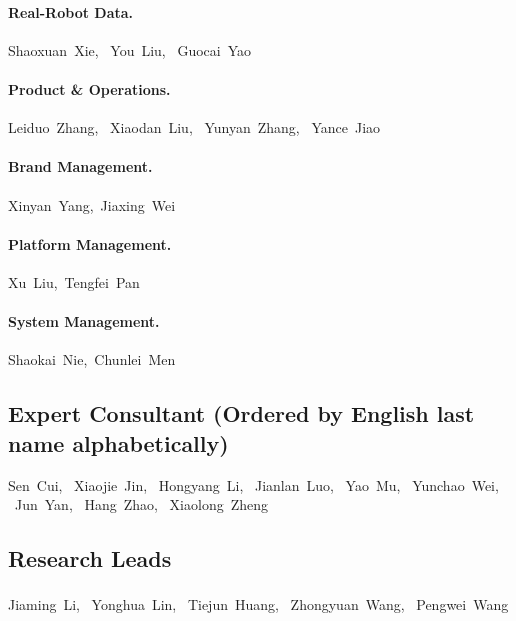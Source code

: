 \documentclass{llmxive}
\makeatletter
\providecommand{\thefootnote}{}
\providecommand{\@makefntext}[1]{\noindent #1}
\makeatother
\begin{document}
\paragraph{Real-Robot Data.}
Shaoxuan~Xie, \
You~Liu, \
Guocai~Yao

\paragraph{Product \& Operations.}
Leiduo~Zhang, \
Xiaodan~Liu, \
Yunyan~Zhang, \
Yance~Jiao

\paragraph{Brand Management.}
Xinyan~Yang,\
Jiaxing~Wei

\paragraph{Platform Management.}
Xu~Liu,\
Tengfei~Pan

\paragraph{System Management.}
Shaokai~Nie,\
Chunlei~Men


\subsection{Expert Consultant (Ordered by English last name alphabetically)}
Sen~Cui, \
Xiaojie~Jin, \
Hongyang~Li, \
Jianlan~Luo, \
Yao~Mu, \
Yunchao~Wei, \
Jun~Yan, \
Hang~Zhao, \
Xiaolong~Zheng


\subsection{Research Leads}
Jiaming~Li, \ 
Yonghua~Lin, \ 
Tiejun~Huang, \ 
Zhongyuan~Wang\textsuperscript{\Letter}, \ 
Pengwei~Wang\textsuperscript{\Letter}

\vspace{5ex}


\makeatletter
\begingroup
  \renewcommand{\thefootnote}{}
  \renewcommand{\@makefntext}[1]{\noindent #1}
\endgroup
\makeatother
\end{document}
